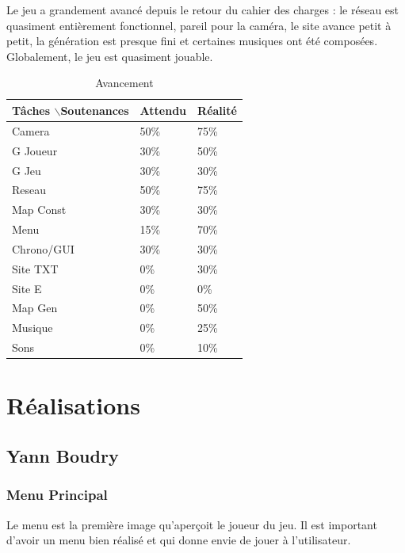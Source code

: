 \documentclass{article}
\begin{document}
Le jeu a grandement avancé depuis le retour du cahier des charges : le réseau est quasiment entièrement fonctionnel, pareil pour la caméra, le site avance petit à petit, la génération est presque fini et certaines musiques ont été composées. Globalement, le jeu est quasiment jouable.
\begin{table}
\centering
\caption{Avancement}
\begin{tabular}{|l|l|l|}
\hline

Tâches $\backslash$Soutenances & Attendu & Réalité \\ \hline
Camera & 50\% & 75\% \\ \hline
G Joueur & 30\% & 50\% \\ \hline
G Jeu & 30\% & 30\% \\ \hline
Reseau & 50\% & 75\% \\ \hline
Map Const & 30\% & 30\% \\ \hline
Menu & 15\% & 70\% \\ \hline
Chrono/GUI & 30\% & 30\% \\ \hline
Site TXT & 0\% & 30\% \\ \hline
Site E & 0\% & 0\% \\ \hline
Map Gen & 0\% & 50\% \\ \hline
Musique & 0\% & 25\% \\ \hline
Sons & 0\% & 10\% \\ \hline

\end{tabular}
\end{table}
 
\newpage
\section{Réalisations}


\subsection{Yann Boudry}

\subsubsection{Menu Principal}

Le menu est la première image qu'aperçoit le joueur du jeu. Il est important d'avoir un menu bien réalisé et qui donne envie de jouer à l'utilisateur.
\end{document}

